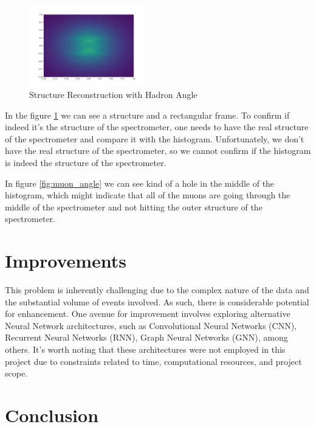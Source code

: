 \documentclass[EPJ,twocolumn]{webofc}
\begin{document}
    \begin{figure}[H]
        \includegraphics[width=0.45\textwidth]{graphs/hadron_angle.png}
        \caption{Structure Reconstruction with Hadron Angle}
        \label{fig:hadron_angle}
    \end{figure}


In the figure \ref{fig:hadron_angle} we can see a structure and a rectangular frame. To confirm if indeed it's
the structure of the spectrometer, one needs to have the real structure of the spectrometer and compare it with the histogram.
Unfortunately, we don't have the real structure of the spectrometer, so we cannot confirm if the histogram is indeed the structure of the spectrometer.

In figure \ref{fig:muon_angle} we can see kind of a hole in the middle of the histogram, which might indicate that all of the muons are going through the middle of the spectrometer and not hitting the outer structure of the spectrometer.


\section{Improvements}
This problem is inherently challenging due to the complex nature of the data and the substantial volume of events involved. As such, there is considerable potential for enhancement. One avenue for improvement involves exploring alternative Neural Network architectures, such as Convolutional Neural Networks (CNN), Recurrent Neural Networks (RNN), Graph Neural Networks (GNN), among others. It's worth noting that these architectures were not employed in this project due to constraints related to time, computational resources, and project scope.


\section{Conclusion}


%
\end{document}
